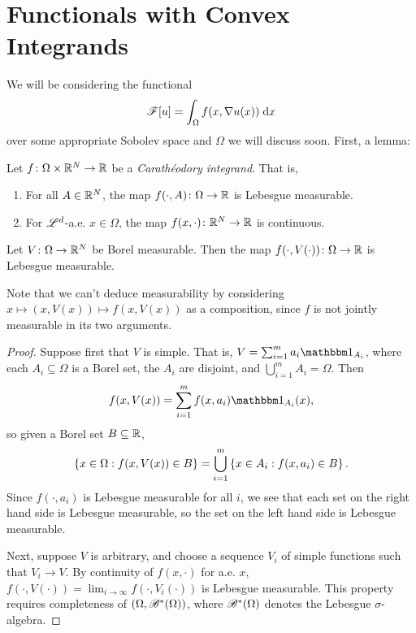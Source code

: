 \section{Functionals with Convex Integrands}
We will be considering the functional
\begin{equation}
    \mathscr{F}[u] = \int_{\Omega} f(x,\nabla u(x)) \; \mathrm{d} x
\end{equation}
over some appropriate Sobolev space and $\Omega$ we will discuss soon. First, a lemma:
\begin{lemma}
    Let $f \colon \Omega \times \mathbb{R}^N \to \mathbb{R}$ be a \textit{Carath\'eodory integrand}. That is,
    \begin{enumerate}[label=\rm{(\roman*)}]
        \item For all $A \in \mathbb{R}^N$, the map $f(\cdot,A) \colon \Omega \to \mathbb{R}$ is Lebesgue measurable.
        \item For $\mathscr{L}^d$-a.e. $x \in \Omega$, the map $f(x,\cdot) \colon \mathbb{R}^N \to \mathbb{R}$ is continuous.
    \end{enumerate}
    Let $V \colon \Omega \to \mathbb{R}^N$ be Borel measurable. Then the map $f(\cdot,V(\cdot)) \colon \Omega \to \mathbb{R}$ is Lebesgue measurable.
\end{lemma}
Note that we can't deduce measurability by considering $x \mapsto (x,V(x)) \mapsto f(x,V(x))$ as a composition, since $f$ is not jointly measurable in its two arguments.
\begin{proof}
    Suppose first that $V$ is simple. That is, $V = \sum_{i=1}^m a_i \bbone_{A_i}$, where each $A_i \subseteq \Omega$ is a Borel set, the $A_i$ are disjoint, and $\bigcup_{i=1}^m A_i = \Omega$. Then 
    \begin{equation}
        f(x,V(x)) = \sum_{i=1}^m f(x,a_i)\bbone_{A_i}(x),
    \end{equation}
    so given a Borel set $B \subseteq \mathbb{R}$,
    \begin{equation}
        \left\{ {x \in \Omega : f(x,V(x)) \in B} \right\} = \bigcup_{i=1}^m \left\{ {x \in A_i : f(x,a_i) \in B} \right\}.
    \end{equation}
    Since $f(\cdot,a_i)$ is Lebesgue measurable for all $i$, we see that each set on the right hand side is Lebesgue measurable, so the set on the left hand side is Lebesgue measurable.

    Next, suppose $V$ is arbitrary, and choose a sequence $V_i$ of simple functions such that $V_i \rightarrow V$. By continuity of $f(x,\cdot)$ for a.e. $x$, $f(\cdot,V(\cdot)) = \lim_{i \rightarrow \infty} f(\cdot, V_i(\cdot))$ is Lebesgue measurable. This property requires completeness of $(\Omega,\mathscr{B}^*(\Omega))$, where $\mathscr{B}^*(\Omega)$ denotes the Lebesgue $\sigma$-algebra.
\end{proof}

